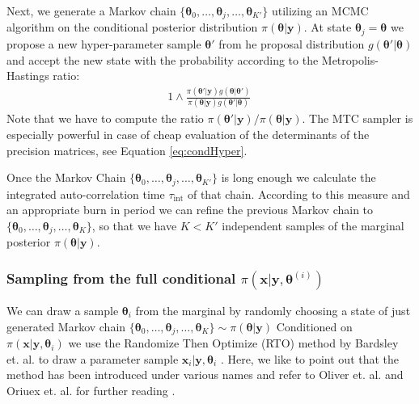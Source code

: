 Next, we generate a Markov chain $\{ \bm{\theta}_0 , \dots  ,\bm{\theta}_j , \dots  ,\bm{\theta}_{K'} \}$ utilizing an MCMC algorithm on the conditional posterior distribution $\pi(\bm{\theta}| \bm{y})$.
At state $\bm{\theta}_j = \bm{\theta} $ we propose a new hyper-parameter sample $\bm{\theta}'$ from he proposal distribution $g(\bm{\theta}'|\bm{\theta})$ and accept the new state with the probability according to the Metropolis-Hastings ratio:
\begin{align}
    1 \wedge \frac{\pi(\bm{\theta}' | \bm{y}) g(\bm{\theta}|\bm{\theta}')}{\pi(\bm{\theta}| \bm{y}) g(\bm{\theta}'|\bm{\theta})} \,
\end{align}
Note that we have to compute the ratio $\pi(\bm{\theta}' | \bm{y}) / \pi(\bm{\theta} | \bm{y})$.
The MTC sampler is especially powerful in case of cheap evaluation of the determinants of the precision matrices, see Equation \ref{eq:condHyper}.

Once the Markov Chain $\{ \bm{\theta}_0 , \dots  ,\bm{\theta}_j , \dots  ,\bm{\theta}_{K'} \}$ is long enough we calculate the integrated auto-correlation time $\tau_{\text{int}}$ of that chain.
According to this measure and an appropriate burn in period we can refine the previous Markov chain to  $\{ \bm{\theta}_0 , \dots  ,\bm{\theta}_j , \dots  ,\bm{\theta}_{K} \}$, so that we have $K<K'$ independent samples of the marginal posterior $\pi(\bm{\theta}| \bm{y})$.



\subsubsection{Sampling from the full conditional $\pi(\bm{x}|\bm{y}, \bm{\theta}^{(i)} )$ }
 We can draw a sample $\bm{\theta}_i$ from the marginal by randomly choosing a state of just generated Markov chain $\{ \bm{\theta}_0 , \dots  ,\bm{\theta}_j , \dots  ,\bm{\theta}_{K} \} \sim \pi(\bm{\theta}| \bm{y})$
Conditioned on $\pi(\bm{x}|\bm{y}, \bm{\theta}_i )$ we use the Randomize Then Optimize (RTO) method by Bardsley et. al. to draw a parameter sample $\bm{x}_i|\bm{y}, \bm{\theta}_i$ \cite{bardsley2012mcmc, bardsley2015randomize}.
Here, we like to point out that the method has been introduced under various names and refer to Oliver et. al. and Oriuex et. al. for further reading \cite{s1996conditioning, orieux2012sampling}.

